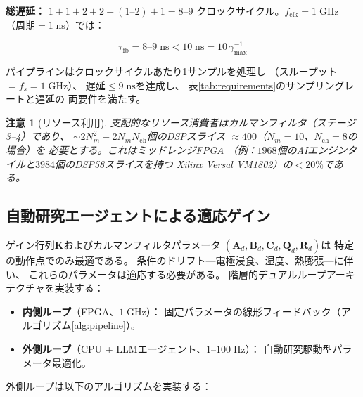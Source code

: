 \documentclass[12pt,twocolumn]{ltjsarticle}
\newtheorem{remark}{注意}
\newcommand{\kk}{\mathbf{K}}
\begin{document}
\textbf{総遅延：} $1 + 1 + 2 + 2 + (1\text{--}2) + 1 = 8\text{--}9$
クロックサイクル。$f_{\mathrm{clk}} = 1\;\mathrm{GHz}$
（周期$= 1\;\mathrm{ns}$）では：

\begin{equation}
  \tau_{\mathrm{fb}} = 8\text{--}9\;\mathrm{ns}
  < 10\;\mathrm{ns} = 10\,\gamma_{\max}^{-1}
  \label{eq:latency_achieved}
\end{equation}

パイプラインはクロックサイクルあたり1サンプルを処理し
（スループット$= f_s = 1\;\mathrm{GHz}$）、
遅延$\leq 9\;\mathrm{ns}$を達成し、
表\ref{tab:requirements}のサンプリングレートと遅延の
両要件を満たす。

\begin{remark}[リソース利用]
支配的なリソース消費者はカルマンフィルタ（ステージ3--4）であり、
$\sim 2 N_m^2 + 2 N_m N_{\mathrm{ch}}$個のDSPスライス
$\approx 400$（$N_m = 10$、$N_{\mathrm{ch}} = 8$の場合）を
必要とする。これはミッドレンジFPGA
（例：$1968$個のAIエンジンタイルと$3984$個のDSP58スライスを持つ
Xilinx Versal VM1802）の$< 20\%$である。
\end{remark}

\subsection{自動研究エージェントによる適応ゲイン}
\label{sec:fpga:autoresearch}

ゲイン行列$\kk$およびカルマンフィルタパラメータ
$(\mathbf{A}_d, \mathbf{B}_d, \mathbf{C}_d, \mathbf{Q}_d, \mathbf{R}_d)$は
特定の動作点でのみ最適である。
条件のドリフト---電極浸食、湿度、熱膨張---に伴い、
これらのパラメータは適応する必要がある。
階層的デュアルループアーキテクチャを実装する：

\begin{itemize}
  \item \textbf{内側ループ}（FPGA、$1\;\mathrm{GHz}$）：
    固定パラメータの線形フィードバック（アルゴリズム\ref{alg:pipeline}）。
  \item \textbf{外側ループ}（CPU + LLMエージェント、$1$--$100\;\mathrm{Hz}$）：
    自動研究駆動型パラメータ最適化。
\end{itemize}

外側ループは以下のアルゴリズムを実装する：
\end{document}

